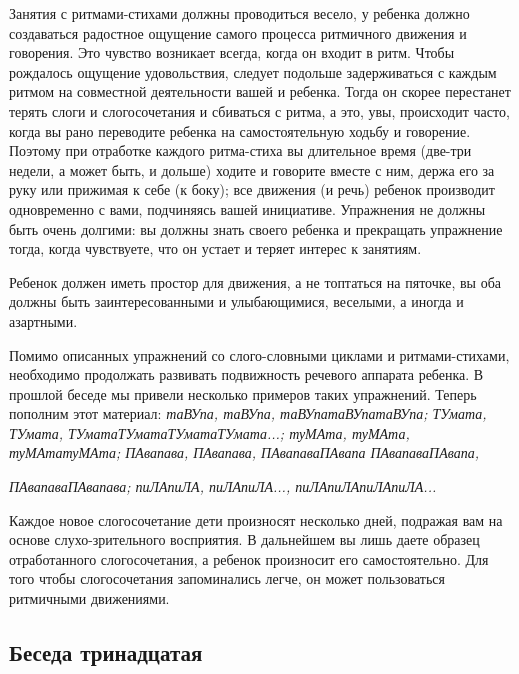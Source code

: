 \documentclass[a5paper]{book}
\renewcommand{\emph}[1]{\textit{#1}}
\begin{document}
Занятия с ритмами-стихами должны проводиться весело, у ребенка должно
создаваться радостное ощущение самого процесса ритмичного движения и
говорения. Это чувство возникает всегда, когда он входит в ритм. Чтобы
рождалось ощущение удовольствия, следует подольше задерживаться с каждым
ритмом на совместной деятельности вашей и ребенка. Тогда он скорее
перестанет терять слоги и слогосочетания и сбиваться с ритма, а это,
увы, происходит часто, когда вы рано переводите ребенка на
самостоятельную ходьбу и говорение. Поэтому при отработке каждого
ритма-стиха вы длительное время (две-три недели, а может быть, и дольше)
ходите и говорите вместе с ним, держа его за руку или прижимая к себе (к
боку); все движения (и речь) ребенок производит одновременно с вами,
подчиняясь вашей инициативе. Упражнения не должны быть очень долгими: вы
должны знать своего ребенка и прекращать упражнение тогда, когда
чувствуете, что он устает и теряет интерес к занятиям.

Ребенок должен иметь простор для движения, а не топтаться на пяточке, вы
оба должны быть заинтересованными и улыбающимися, веселыми, а иногда и
азартными.

Помимо описанных упражнений со слого-словными циклами и ритмами-стихами,
необходимо продолжать развивать подвижность речевого аппарата ребенка. В
прошлой беседе мы привели несколько примеров таких упражнений. Теперь
пополним этот материал: \emph{таВУпа, таВУпа, таВУпатаВУпатаВУпа;
ТУмата, ТУмата, ТУматаТУматаТУматаТУмата...; туМАта, туМАта,
туМАтатуМАта; ПАвапава, ПАвапава, ПАвапаваПАвапа ПАвапаваПАвапа,}

\emph{ПАвапаваПАвапава; пиЛАпиЛА, пиЛАпиЛА..., пиЛАпиЛАпиЛАпиЛА...}

Каждое новое слогосочетание дети произносят несколько дней, подражая вам
на основе слухо-зрительного восприятия. В дальнейшем вы лишь даете
образец отработанного слогосочетания, а ребенок произносит его
самостоятельно. Для того чтобы слогосочетания запоминались легче, он
может пользоваться ритмичными движениями.

\subsection*{Беседа тринадцатая}
\end{document}
